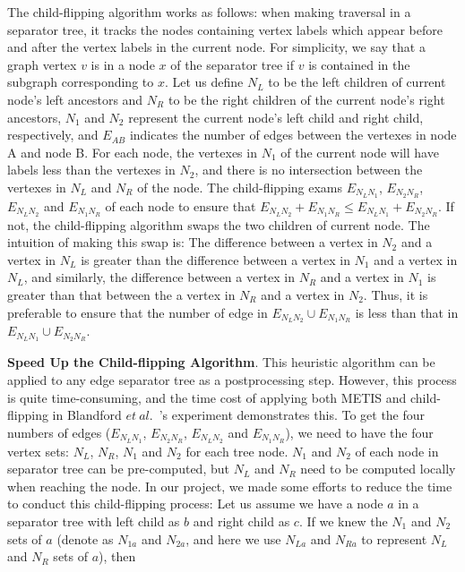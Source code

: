 \documentclass[12pt,glossary]{dalthesis}
\begin{document}
\bigskip
\bigskip

The child-flipping algorithm works as follows: when making traversal in a separator tree, it tracks the nodes containing vertex labels which appear before and after the vertex labels in the current node. For simplicity, we say that a graph vertex $v$ is in a node $x$ of the separator tree if $v$ is contained in the subgraph corresponding to $x$. Let us define $N_{L}$ to be the left children of current node's left ancestors and $N_{R}$ to be the right children of the current node's right ancestors, $N_{1}$ and $N_{2}$ represent the current node's left child and right child, respectively, and $E_{AB}$ indicates the number of edges between the vertexes in node A and node B. For each node, the vertexes in $N_{1}$ of the current node will have labels less than the vertexes in $N_{2}$, and there is no intersection between the vertexes in $N_{L}$ and $N_{R}$ of the node. The child-flipping exams $E_{N_{L}N_{1}}$, $E_{N_{2}N_{R}}$, $E_{N_{L}N_{2}}$ and $E_{N_{1}N_{R}}$ of each node to ensure that $E_{N_{L}N_{2}} + E_{N_{1}N_{R}} \leq E_{N_{L}N_{1}} + E_{N_{2}N_{R}}$. If not, the child-flipping algorithm swaps the two children of current node. The intuition of making this swap is: The difference between a vertex in $N_{2}$ and a vertex in $N_{L}$ is greater than the difference between a vertex in $N_{1}$ and a vertex in $N_{L}$, and similarly, the difference between a vertex in $N_{R}$ and a vertex in $N_{1}$ is greater than that between the a vertex in $N_{R}$ and a vertex in $N_{2}$. Thus, it is preferable to ensure that the number of edge in $E_{N_{L}N_{2}} \cup E_{N_{1}N_{R}}$ is less than that in $E_{N_{L}N_{1}} \cup E_{N_{2}N_{R}}$.

\bigskip
\bigskip

\textbf{Speed Up the Child-flipping Algorithm}. This heuristic algorithm can be applied to any edge separator tree as a postprocessing step. However, this process is quite time-consuming, and the time cost of applying both METIS and child-flipping in Blandford $et \ al.$~\cite{compact-representation}'s experiment demonstrates this. To get the four numbers of edges ($E_{N_{L}N_{1}}$, $E_{N_{2}N_{R}}$, $E_{N_{L}N_{2}}$ and $E_{N_{1}N_{R}}$), we need to have the four vertex sets: $N_{L}$, $N_{R}$, $N_{1}$ and $N_{2}$ for each tree node. $N_{1}$ and $N_{2}$ of each node in separator tree can be pre-computed, but $N_{L}$ and $N_{R}$ need to be computed locally when reaching the node. In our project, we made some efforts to reduce the time to conduct this child-flipping process: Let us assume we have a node $a$ in a separator tree with left child as $b$ and right child as $c$. If we knew the $N_{1}$ and $N_{2}$ sets of $a$ (denote as $N_{1a}$ and $N_{2a}$, and here we use $N_{La}$ and $N_{Ra}$ to represent $N_{L}$ and $N_{R}$ sets of $a$), then
\end{document}
